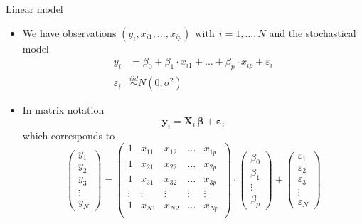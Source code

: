 \documentclass[aspectratio=169]{beamer}
\newcommand{\vect}[1]{\mathbf{#1}}
\newcommand{\mat}[1]{\mathbf{#1}}
\newcommand{\gvect}[1]{\boldsymbol{#1}}
\begin{document}
\begin{frame}{Linear model}
  \begin{itemize}
    \item We have observations $(y_i, x_{i1}, \ldots, x_{ip}) ~~\text{with}~~ i = 1, \ldots, N$
and the stochastical model
\begin{align*}
  y_i & = \beta_0 + \beta_1 \cdot x_{i1} + \ldots + \beta_p \cdot x_{ip} +
        \varepsilon_i \\
  \varepsilon_i & \overset{iid}{\sim} N (0, \sigma^2)
\end{align*}

\vspace{-.4cm}
\item In matrix notation
\[
  \vect{y}_i = \mat{X}_i \, \gvect{\beta} + \gvect{\varepsilon}_i
\]
which corresponds to
\[
  \begin{pmatrix}
    y_1 \\
    y_2 \\
    y_3 \\
    \vdots \\
    y_N
  \end{pmatrix} = 
  \begin{pmatrix}
    1 & x_{11} & x_{12} & \dots & x_{1p} \\
    1 & x_{21} & x_{22} & \dots & x_{2p} \\
    1 & x_{31} & x_{32} & \dots & x_{3p} \\
    \vdots & \vdots & \vdots & \vdots & \vdots \\
    1 & x_{N1} & x_{N2} & \dots & x_{Np} \\
  \end{pmatrix} \cdot
  \begin{pmatrix}
    \beta_0 \\
    \beta_1 \\
    \vdots \\
    \beta_p
  \end{pmatrix} +
  \begin{pmatrix}
    \varepsilon_1 \\
    \varepsilon_2 \\
    \varepsilon_3 \\
    \vdots \\
    \varepsilon_N
  \end{pmatrix}
\]
  \end{itemize}
\end{frame}
\end{document}
